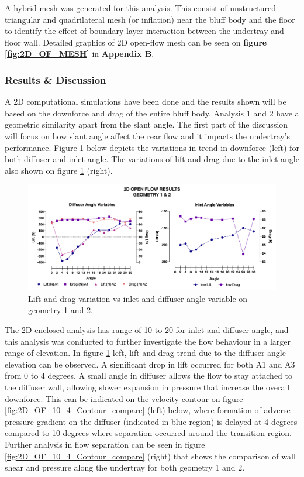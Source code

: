 \noindent A hybrid mesh was generated for this analysis. This consist of unstructured triangular and quadrilateral mesh (or inflation) near the bluff body and the floor to identify the effect of boundary layer interaction between the undertray and floor wall.  Detailed graphics of 2D open-flow mesh can be seen on \textbf{figure \ref{fig:2D_OF_MESH}} in \textbf{Appendix B}.

\subsubsection{Results \& Discussion}

\noindent A 2D computational simulations have been done and the results shown will be based on the downforce and drag of the entire bluff body. Analysis 1 and 2 have a geometric similarity apart from the slant angle. The first part of the discussion will focus on how slant angle affect the rear flow and it impacts the undertray's performance. Figure \ref{fig:2D_OF_A12_results} below depicts the variations in trend in downforce (left) for both diffuser and inlet angle. The variations of lift and drag due to the inlet angle also shown on figure \ref{fig:2D_OF_A12_results} (right).

\begin{figure}[!ht]
    \centering
    \includegraphics[scale = 0.6]{Figures/Graph/2D_OF_A1-2.png}
    \caption{Lift and drag variation vs inlet and diffuser angle variable on geometry 1 and 2. }
    \label{fig:2D_OF_A12_results}
\end{figure}

\noindent The 2D enclosed analysis has range of 10 to 20 for inlet and diffuser angle, and this analysis was conducted to further investigate the flow behaviour in a larger range of elevation. In figure \ref{fig:2D_OF_A12_results} left, lift and drag trend due to the diffuser angle elevation can be observed. A significant drop in lift occurred for both A1 and A3 from 0 to 4 degrees. A small angle in diffuser allows the flow to stay attached to the diffuser wall, allowing slower expansion in pressure that increase the overall downforce. This can be indicated on the velocity contour on figure \ref{fig:2D_OF_10_4_Contour_compare} (left) below, where formation of adverse pressure gradient on the diffuser  (indicated in blue region) is delayed at 4 degrees compared to 10 degrees where separation occurred around the transition region. Further analysis in flow separation can be seen in figure \ref{fig:2D_OF_10_4_Contour_compare} (right)  that shows the comparison of wall shear and pressure along the undertray for both geometry 1 and 2. 


